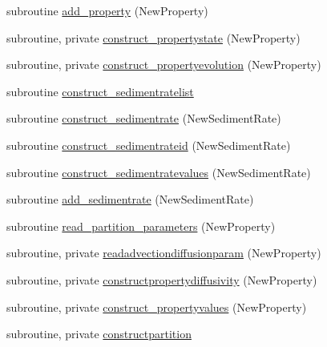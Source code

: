 \begin{DoxyCompactItemize}
\item 
subroutine \mbox{\hyperlink{namespacemoduleporousmediaproperties_a199bd8a8509f7ddd865f230c56680292}{add\+\_\+property}} (New\+Property)
\item 
subroutine, private \mbox{\hyperlink{namespacemoduleporousmediaproperties_a401ffa0cf421489bbc331e312e10ebd2}{construct\+\_\+propertystate}} (New\+Property)
\item 
subroutine, private \mbox{\hyperlink{namespacemoduleporousmediaproperties_a7475f0f419f35758071e5f74d001e408}{construct\+\_\+propertyevolution}} (New\+Property)
\item 
subroutine \mbox{\hyperlink{namespacemoduleporousmediaproperties_acc3491b7ab1e55b078caa370b4c75601}{construct\+\_\+sedimentratelist}}
\item 
subroutine \mbox{\hyperlink{namespacemoduleporousmediaproperties_abfc3b112a762e28d4f711dfe4a5d7d3d}{construct\+\_\+sedimentrate}} (New\+Sediment\+Rate)
\item 
subroutine \mbox{\hyperlink{namespacemoduleporousmediaproperties_a4bcf212cc66413ac54a86d6f71dab6d6}{construct\+\_\+sedimentrateid}} (New\+Sediment\+Rate)
\item 
subroutine \mbox{\hyperlink{namespacemoduleporousmediaproperties_a38a540abbf59777875ca535ba0683c59}{construct\+\_\+sedimentratevalues}} (New\+Sediment\+Rate)
\item 
subroutine \mbox{\hyperlink{namespacemoduleporousmediaproperties_a4a94ca075eedbc0f235c5c681470aee8}{add\+\_\+sedimentrate}} (New\+Sediment\+Rate)
\item 
subroutine \mbox{\hyperlink{namespacemoduleporousmediaproperties_a2b4f624f18ff4621d00ca5923d59cc36}{read\+\_\+partition\+\_\+parameters}} (New\+Property)
\item 
subroutine, private \mbox{\hyperlink{namespacemoduleporousmediaproperties_af16278987bb08e48f63b916cf573a68d}{readadvectiondiffusionparam}} (New\+Property)
\item 
subroutine, private \mbox{\hyperlink{namespacemoduleporousmediaproperties_a03d5423382489d1918532f58f478c446}{constructpropertydiffusivity}} (New\+Property)
\item 
subroutine, private \mbox{\hyperlink{namespacemoduleporousmediaproperties_a72fa2352db155b8e701aa97c7aad155c}{construct\+\_\+propertyvalues}} (New\+Property)
\item 
subroutine, private \mbox{\hyperlink{namespacemoduleporousmediaproperties_a61c528a081f6e7bd050ab2482d187fe5}{constructpartition}}
\item 

\end{DoxyCompactItemize}
